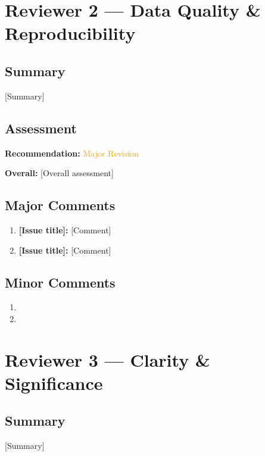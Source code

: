 \documentclass[11pt, a4paper]{article}
\begin{document}
\vspace{2em}

\section{Reviewer 2 — Data Quality \& Reproducibility}

\subsection*{Summary}
[Summary]

\subsection*{Assessment}
\textbf{Recommendation:} \textcolor{orange}{Major Revision}

\textbf{Overall:} [Overall assessment]

\subsection*{Major Comments}
\begin{enumerate}[leftmargin=*, label=\textbf{M\arabic*.}]
  \item \textbf{[Issue title]:} [Comment]
  \item \textbf{[Issue title]:} [Comment]
\end{enumerate}

\subsection*{Minor Comments}
\begin{enumerate}[leftmargin=*, label=\textbf{m\arabic*.}]
  \item [Minor comment]
  \item [Minor comment]
\end{enumerate}

\vspace{2em}

\section{Reviewer 3 — Clarity \& Significance}

\subsection*{Summary}
[Summary]
\end{document}

